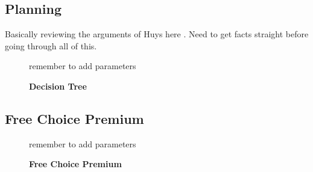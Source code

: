 \documentclass[11pt]{article} %
\begin{document}
\subsection{Planning}

Basically reviewing the arguments of Huys here \citep{Huys2012, Lally2017}.
Need to get facts straight before going through all of this.

\begin{figure}
  \centerline{%
  }
  \caption{\textbf{Decision Tree}}
  \par remember to add parameters
\end{figure}

\subsection{Free Choice Premium}

\begin{figure}
  \centerline{%
  }
  \caption{\textbf{Free Choice Premium}}
  \par remember to add parameters
\end{figure}
\end{document}
